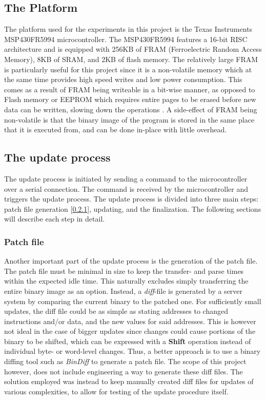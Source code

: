 \subsection{The Platform}\label{sec:platform}
The platform used for the experiments in this project is the Texas Instruments MSP430FR5994 microcontroller. The MSP430FR5994 features a 16-bit RISC architecture and is equipped with 256KB of FRAM (Ferroelectric Random Access Memory), 8KB of SRAM, and 2KB of flash memory. The relatively large FRAM is particularly useful for this project since it is a non-volatile memory which at the same time provides high speed writes and low power consumption. This comes as a result of FRAM being writeable in a bit-wise manner, as opposed to Flash memory or EEPROM which requires entire pages to be erased before new data can be written, slowing down the operations \cite{framReport}. A side-effect of FRAM being non-volatile is that the binary image of the program is stored in the same place that it is executed from, and can be done in-place with little overhead. 

\subsection{The update process}
The update process is initiated by sending a command to the microcontroller over a serial connection. The command is received by the microcontroller and triggers the update process. The update process is divided into three main steps: patch file generation [\ref{sec:patchfile}], updating, and the finalization. The following sections will describe each step in detail.

\subsubsection{Patch file}\label{sec:patchfile}
Another important part of the update process is the generation of the patch file. The patch file must be minimal in size to keep the transfer- and parse times within the expected idle time. This naturally excludes simply transferring the entire binary image as an option. Instead, a \textit{diff}-file is generated by a server system by comparing the current binary to the patched one. For sufficiently small updates, the diff file could be as simple as stating addresses to changed instructions and/or data, and the new values for said addresses. This is however not ideal in the case of bigger updates since changes could cause portions of the binary to be shifted, which can be expressed with a \textbf{Shift} operation instead of individual byte- or word-level changes. Thus, a better approach is to use a binary diffing tool such as \textit{BinDiff} to generate a patch file. The scope of this project however, does not include engineering a way to generate these diff files. The solution employed was instead to keep manually created diff files for updates of various complexities, to allow for testing of the update procedure itself. 



